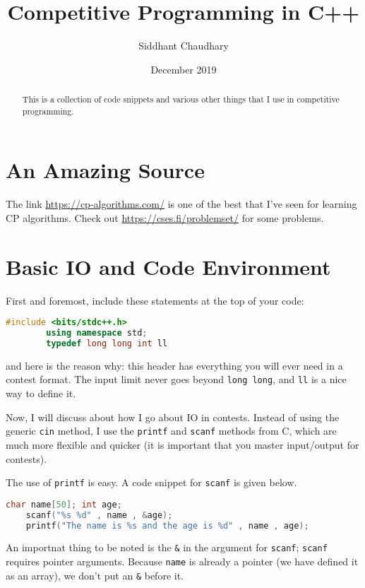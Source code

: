 \documentclass[12pt,a4paper]{amsart}
\numberwithin{equation}{section}
\theoremstyle{definition}
\begin{document}
\title{Competitive Programming in C++}
\author{Siddhant Chaudhary}
\date{December 2019}

\maketitle
    
\begin{abstract}
This is a collection of code snippets and various other things that I use in competitive programming.
\end{abstract}
    
\tableofcontents

\section{An Amazing Source}
\noindent The link \url{https://cp-algorithms.com/} is one of the best that I've seen for learning CP algorithms. Check out \url{https://cses.fi/problemset/} for some problems. 

\section{Basic IO and Code Environment}
\noindent First and foremost, include these statements at the top of your code:
    \begin{lstlisting}[language=C++]
        #include <bits/stdc++.h>
        using namespace std; 
        typedef long long int ll
    \end{lstlisting}
and here is the reason why: this header has everything you will ever need in a contest format. The input limit never goes beyond \verb|long long|, and \verb|ll| is a nice way to define it. 

\noindent Now, I will discuss about how I go about IO in contests. Instead of using the generic \verb|cin| method, I use the \verb|printf| and \verb|scanf| methods from C, which are much more flexible and quicker (it is important that you master input/output for contests). 

\noindent The use of \verb|printf| is easy. A code snippet for \verb|scanf| is given below.
\begin{lstlisting}[language=C++]
    char name[50]; int age;
    scanf("%s %d" , name , &age);
    printf("The name is %s and the age is %d" , name , age);
\end{lstlisting}
An importnat thing to be noted is the \verb|&| in the argument for \verb|scanf|; \verb|scanf| requires pointer arguments. Because \verb|name| is already a pointer (we have defined it as an array), we don't put an \verb|&| before it.
\end{document}
